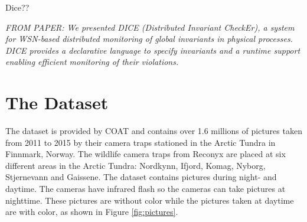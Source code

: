 \documentclass[USenglish]{uit-thesis}
\begin{document}
Dice?? \cite{dice}

\textit{FROM PAPER: We presented DICE (Distributed Invariant CheckEr), a system for WSN-based distributed monitoring of global invariants in physical processes. DICE provides a declarative language to specify invariants and a runtime support enabling efficient monitoring of their violations.}








\chapter{The Dataset} \label{chap:data_set}

The dataset is provided by COAT and contains over 1.6 millions of pictures taken from 2011 to 2015 by their camera traps stationed in the Arctic Tundra in Finnmark, Norway. The wildlife camera traps from Reconyx are placed at six different areas in the Arctic Tundra: Nordkynn, Ifjord, Komag, Nyborg, Stjernevann and Gaissene.
The dataset contains pictures during night- and daytime. The cameras have infrared flash so the cameras can take pictures at nighttime. These pictures are without color while the pictures taken at daytime are with color, as shown in Figure \ref{fig:pictures}.
\end{document}
